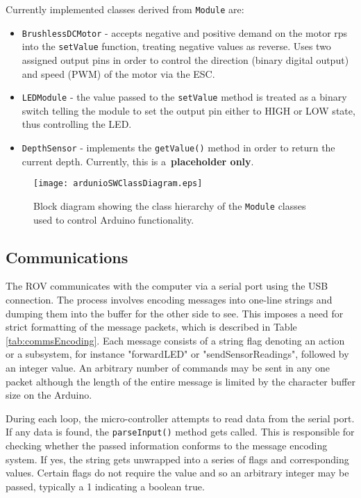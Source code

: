 Currently implemented classes derived from \texttt{Module} are:
%
\begin{itemize}
\item \texttt{BrushlessDCMotor} - accepts negative and positive demand on the motor rps into the \texttt{setValue} function, treating negative values as reverse. Uses two assigned output pins in order to control the direction (binary digital output) and speed (PWM) of the motor via the ESC.
\item \texttt{LEDModule} - the value passed to the \texttt{setValue} method is treated as a binary switch telling the module to set the output pin either to HIGH or LOW state, thus controlling the LED.
\item \texttt{DepthSensor} - implements the \texttt{getValue()} method in order to return the current depth. Currently, this is a~\textbf{placeholder only}.
\end{itemize}

\begin{figure}[p]
\centering
\texttt{[image: ardunioSWClassDiagram.eps]}
\caption{Block diagram showing the class hierarchy of the \texttt{Module} classes used to control Arduino functionality.}
\label{fig:moduleClasses}
\end{figure}

\subsection{Communications}

The ROV communicates with the computer via a serial port using the USB connection. The process involves encoding messages into one-line strings and dumping them into the buffer for the other side to see. This imposes a need for strict formatting of the message packets, which is described in Table \ref{tab:commsEncoding}. Each message consists of a string flag denoting an action or a subsystem, for instance "forwardLED" or "sendSensorReadings", followed by an integer value. An arbitrary number of commands may be sent in any one packet although the length of the entire message is limited by the character buffer size on the Arduino.

During each loop, the micro-controller attempts to read data from the serial port. If any data is found, the \texttt{parseInput()} method gets called. This is responsible for checking whether the passed information conforms to the message encoding system. If yes, the string gets unwrapped into a series of flags and corresponding values. Certain flags do not require the value and so an arbitrary integer may be passed, typically a 1 indicating a boolean true.

